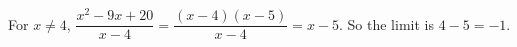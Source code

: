 For $x\ne4$, $\dfrac{x^2-9x+20}{x-4}=\dfrac{(x-4)(x-5)}{x-4}=x-5$. So the limit is $4-5=\boxed{-1}$.
